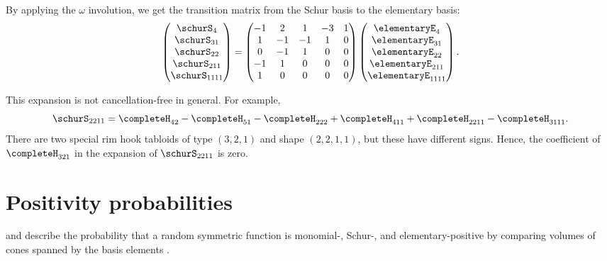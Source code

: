 \begin{example*}[The inverse Kostka matrix for $n=4$]
By applying the $\omega$ involution, we get the transition matrix
from the Schur basis to the elementary basis:
\[
\begin{pmatrix}
\schurS_{4} \\
\schurS_{31} \\
\schurS_{22} \\
\schurS_{211} \\
\schurS_{1111} \\
\end{pmatrix}
=
\begin{pmatrix}
 -1 & 2 & 1 & -3 & 1 \\
 1 & -1 & -1 & 1 & 0 \\
 0 & -1 & 1 & 0 & 0 \\
 -1 & 1 & 0 & 0 & 0 \\
 1 & 0 & 0 & 0 & 0 \\
\end{pmatrix}
\begin{pmatrix}
\elementaryE_{4} \\
\elementaryE_{31} \\
\elementaryE_{22} \\
\elementaryE_{211} \\
\elementaryE_{1111} \\
\end{pmatrix}.
\]


\end{example*}


This expansion is not cancellation-free in general.  For example,
\[
\schurS_{2211}
=
\completeH_{42} - \completeH_{51} - \completeH_{222}
+ \completeH_{411} + \completeH_{2211} - \completeH_{3111}.
\]
There are two special rim hook tabloids of type $(3,2,1)$ and shape
$(2,2,1,1)$, but these have different signs.
Hence, the coefficient of $\completeH_{321}$ in the expansion of
$\schurS_{2211}$ is zero.



\section[positivityProbabilities]{Positivity probabilities}

 and  describe the
probability that a random symmetric function is monomial-, Schur-, and
elementary-positive by comparing volumes of cones spanned by the basis
elements \cite{PatriasWilligenburg2018}.
